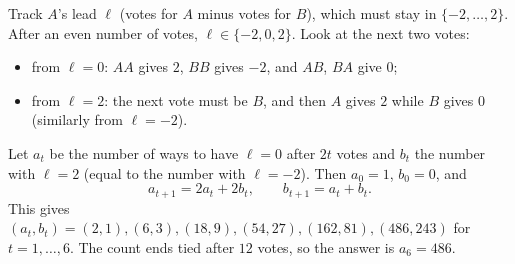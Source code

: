 Track $A$'s lead $\ell$ (votes for $A$ minus votes for $B$), which must stay in $\{-2,\dots,2\}$. After an even number of votes, $\ell\in\{-2,0,2\}$. Look at the next two votes:
\begin{itemize}
\item from $\ell=0$: $AA$ gives $2$, $BB$ gives $-2$, and $AB$, $BA$ give $0$;
\item from $\ell=2$: the next vote must be $B$, and then $A$ gives $2$ while $B$ gives $0$ (similarly from $\ell=-2$).
\end{itemize}
Let $a_t$ be the number of ways to have $\ell=0$ after $2t$ votes and $b_t$ the number with $\ell=2$ (equal to the number with $\ell=-2$). Then $a_0=1$, $b_0=0$, and
\[a_{t+1}=2a_t+2b_t,\qquad b_{t+1}=a_t+b_t.\]
This gives $(a_t,b_t)=(2,1),(6,3),(18,9),(54,27),(162,81),(486,243)$ for $t=1,\dots,6$. The count ends tied after $12$ votes, so the answer is $a_6=\boxed{486}$.
